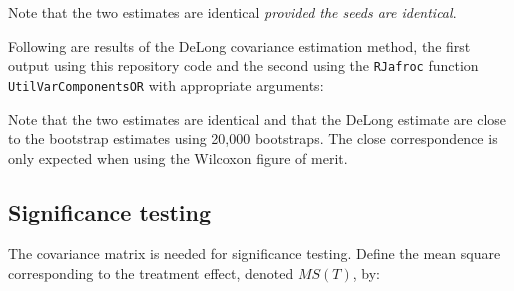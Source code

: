 \documentclass[
]{book}
\newenvironment{Shaded}{\begin{snugshade}}{\end{snugshade}}
\newcommand{\CommentTok}[1]{\textcolor[rgb]{0.56,0.35,0.01}{\textit{#1}}}
\newcommand{\DataTypeTok}[1]{\textcolor[rgb]{0.13,0.29,0.53}{#1}}
\newcommand{\KeywordTok}[1]{\textcolor[rgb]{0.13,0.29,0.53}{\textbf{#1}}}
\newcommand{\NormalTok}[1]{#1}
\newcommand{\OperatorTok}[1]{\textcolor[rgb]{0.81,0.36,0.00}{\textbf{#1}}}
\newcommand{\StringTok}[1]{\textcolor[rgb]{0.31,0.60,0.02}{#1}}
\begin{document}
Note that the two estimates are identical \emph{provided the seeds are identical}.

Following are results of the DeLong covariance estimation method, the first output using this repository code and the second using the \texttt{RJafroc} function \texttt{UtilVarComponentsOR} with appropriate arguments:

\begin{Shaded}
\end{Shaded}

Note that the two estimates are identical and that the DeLong estimate are close to the bootstrap estimates using 20,000 bootstraps. The close correspondence is only expected when using the Wilcoxon figure of merit.

\hypertarget{significance-testing-1}{%
\subsection{Significance testing}\label{significance-testing-1}}

The covariance matrix is needed for significance testing. Define the mean square corresponding to the treatment effect, denoted \(MS(T)\), by:
\end{document}
